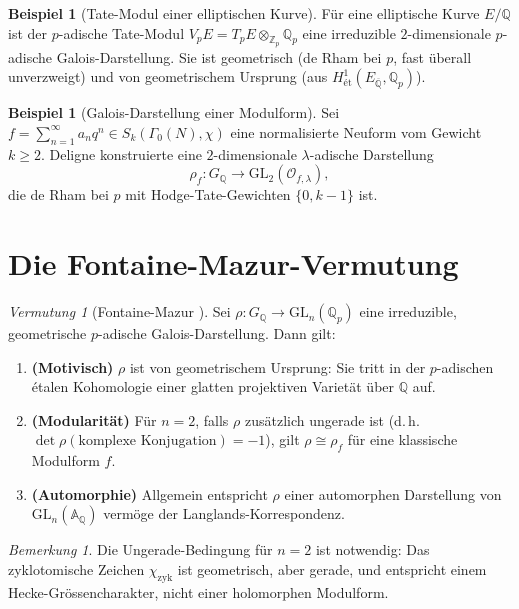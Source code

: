 \documentclass[12pt,a4paper]{amsart}
\theoremstyle{definition}
\newtheorem{example}[theorem]{Beispiel}
\theoremstyle{remark}
\newtheorem{bemerkung}[theorem]{Bemerkung}
\newtheorem{vermutung}[theorem]{Vermutung}
\newcommand{\GL}{\mathrm{GL}}
\newcommand{\Qp}{\mathbb{Q}_p}
\newcommand{\Zp}{\mathbb{Z}_p}
\newcommand{\Qbar}{\overline{\mathbb{Q}}}
\newcommand{\GQ}{G_{\mathbb{Q}}}
\newcommand{\Q}{\mathbb{Q}}
\begin{document}
\begin{example}[Tate-Modul einer elliptischen Kurve]
  Für eine elliptische Kurve $E/\Q$ ist der $p$-adische Tate-Modul
  $V_p E = T_p E \otimes_{\Zp} \Qp$
  eine irreduzible $2$-dimensionale $p$-adische Galois-Darstellung.
  Sie ist geometrisch (de Rham bei $p$, fast überall unverzweigt) und von
  geometrischem Ursprung (aus $H^1_{\text{\'et}}(E_{\Qbar}, \Qp)$).
\end{example}

\begin{example}[Galois-Darstellung einer Modulform]
  Sei $f = \sum_{n=1}^\infty a_n q^n \in S_k(\Gamma_0(N), \chi)$ eine normalisierte
  Neuform vom Gewicht $k \geq 2$. Deligne \cite{Deligne1971} konstruierte eine
  $2$-dimensionale $\lambda$-adische Darstellung
  \[
    \rho_f \colon \GQ \to \GL_2(\mathcal{O}_{f,\lambda}),
  \]
  die de Rham bei $p$ mit Hodge-Tate-Gewichten $\{0, k-1\}$ ist.
\end{example}

\section{Die Fontaine-Mazur-Vermutung}\label{sec:vermutung}

\begin{vermutung}[Fontaine-Mazur \cite{FM1995}]\label{verm:FM}
  Sei $\rho\colon \GQ \to \GL_n(\Qp)$ eine irreduzible, geometrische $p$-adische
  Galois-Darstellung. Dann gilt:
  \begin{enumerate}[label=(\alph*)]
    \item \textbf{(Motivisch)} $\rho$ ist von geometrischem Ursprung: Sie tritt in der
      $p$-adischen étalen Kohomologie einer glatten projektiven Varietät über $\Q$ auf.
    \item \textbf{(Modularität)} Für $n=2$, falls $\rho$ zusätzlich ungerade ist
      (d.\,h.\ $\det\rho(\text{komplexe Konjugation}) = -1$), gilt
      $\rho \cong \rho_f$ für eine klassische Modulform $f$.
    \item \textbf{(Automorphie)} Allgemein entspricht $\rho$ einer automorphen
      Darstellung von $\GL_n(\mathbb{A}_\Q)$ vermöge der Langlands-Korrespondenz.
  \end{enumerate}
\end{vermutung}

\begin{bemerkung}
  Die Ungerade-Bedingung für $n=2$ ist notwendig: Das zyklotomische Zeichen
  $\chi_{\mathrm{zyk}}$ ist geometrisch, aber gerade, und entspricht einem
  Hecke-Grössencharakter, nicht einer holomorphen Modulform.
\end{bemerkung}
\end{document}
